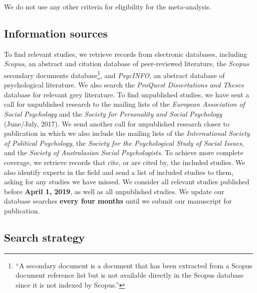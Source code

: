 \documentclass[10pt, a4paper]{article}
\begin{document}
We do not use any other criteria for eligibility for the meta-analysis.

\subsection{Information sources}
\label{sec:information-sources}

To find relevant studies, we retrieve records from electronic databases, including \emph{Scopus}, an abstract and citation database of peer-reviewed literature, the \emph{Scopus} secondary documents database\footnote{``A secondary document is a document that has been extracted from a Scopus document reference list but is not available directly in the Scopus database since it is not indexed by Scopus.''}, and \emph{PsycINFO}, an abstract database of psychological literature. We also search the \emph{ProQuest Dissertations and Theses} database for relevant grey literature. To find unpublished studies, we have sent a call for unpublished research to the mailing lists of the \emph{European Association of Social Psychology} and the \emph{Society for Personality and Social Psychology} (June/July, 2017). We send another call for unpublished research closer to publication in which we also include the mailing lists of the \emph{International Society of Political Psychology}, the \emph{Society for the Psychological Study of Social Issues}, and the \emph{Society of Australasian Social Psychologists}. To achieve more complete coverage, we retrieve records that cite, or are cited by, the included studies. We also identify experts in the field and send a list of included studies to them, asking for any studies we have missed. We consider all relevant studies published before \textbf{April 1, 2019}, as well as all unpublished studies. We update our database searches \textbf{every four months} until we submit our manuscript for publication.

\subsection{Search strategy}
\label{sec:search-strategy}
\end{document}
